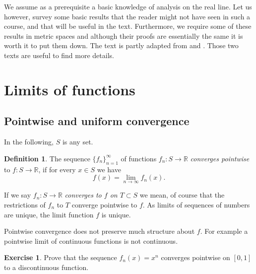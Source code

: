 \documentclass[12pt,openany]{book}
\newcommand{\R}{{\mathbb{R}}}
\newcommand{\myindex}[1]{#1\index{#1}}
\theoremstyle{plain}
\theoremstyle{remark}
\theoremstyle{definition}
\newtheorem{defn}[thm]{Definition}
\newenvironment{exbox}{%
    \def\FrameCommand{\vrule width 1pt \relax\hspace {10pt}}%
    \MakeFramed {\advance \hsize -\width \FrameRestore }%
}{%
    \endMakeFramed
}
\theoremstyle{exercise}
\newtheorem{exercise}{Exercise}[section]
\theoremstyle{example}
\begin{document}
We assume as a prerequisite a basic knowledge of analysis on the real line.
Let us however, survey some basic results that the reader might not have
seen in such a course, and that will be useful in the text.  Furthermore,
we require some of these results in metric spaces and although their proofs
are essentially the same it is worth it to put them down.
The text is partly adapted from \cite{ra:book} and \cite{ra:book2}.
Those two texts are useful to find more details.


\section{Limits of functions}
\label{sec:puconv}

\subsection{Pointwise and uniform convergence}

In the following, $S$ is any set.

\begin{defn}
The sequence
$\{ f_n \}_{n=1}^\infty$ of functions $f_n \colon S \to \R$
\emph{\myindex{converges pointwise}} to $f \colon S \to \R$, if for every $x
\in S$
we have
\begin{equation*}
f(x) =
\lim_{n\to\infty} f_n(x) .
\end{equation*}
\end{defn}

If we say $f_n \colon S \to \R$
\emph{converges to $f$ on $T \subset S$}
we mean, of course that
the restrictions of $f_n$ to $T$ converge pointwise to $f$.
As limits of sequences of numbers are unique, the limit function $f$ is unique.

Pointwise convergence does not preserve much structure about $f$.
For example a pointwise limit of continuous functions is not continuous.

\begin{exbox}
\begin{exercise}
Prove that the sequence $f_n(x) = x^{n}$ converges pointwise on $[0,1]$ to
a discontinuous function.
\end{exercise}
\end{exbox}
\end{document}
